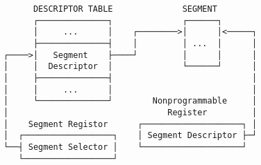 \documentclass[varwidth=35em]{standalone}
\begin{document}
\begin{verbatim}
      DESCRIPTOR TABLE              SEGMENT
      ┌──────────────┐              ┌──────┐
      │     ...      │    ┌────────>│      │<─────┐
      ├──────────────┤    │         │ ...  │      │
┌────>│   Segment    ├────┘         │      │      │
│     │  Descriptor  │              └──────┘      │
│     ├──────────────┤                            │
│     │     ...      │                            │
│     └──────────────┘        Nonprogrammable     │
│                                Register         │
│    Segment Registor      ┌────────────────────┐ │
│  ┌──────────────────┐    │ Segment Descriptor ├─┘
└──┤ Segment Selector │    └────────────────────┘
   └──────────────────┘
\end{verbatim}
\end{document}

